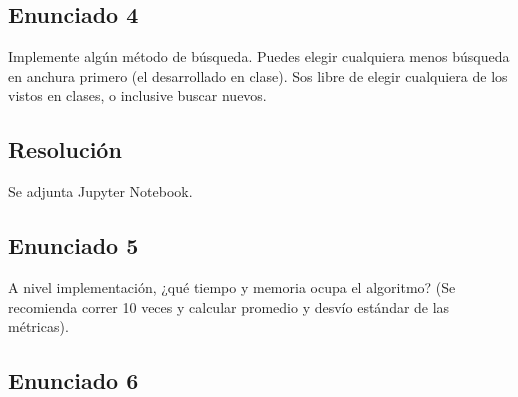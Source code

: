 \documentclass[12pt]{article}
\begin{document}
%

\subsection*{Enunciado 4}
        
Implemente algún método de búsqueda. Puedes elegir cualquiera menos búsqueda en anchura primero (el desarrollado 
en clase). Sos libre de elegir cualquiera de los vistos en clases, o inclusive buscar nuevos.
\subsection*{Resolución}
\vspace{0.1in}

Se adjunta Jupyter Notebook.

\newpage

%

\subsection*{Enunciado 5}

A nivel implementación, ¿qué tiempo y memoria ocupa el algoritmo? (Se recomienda correr 10 veces y calcular 
promedio y desvío estándar de las métricas).


\subsection*{Enunciado 6}
\end{document}
